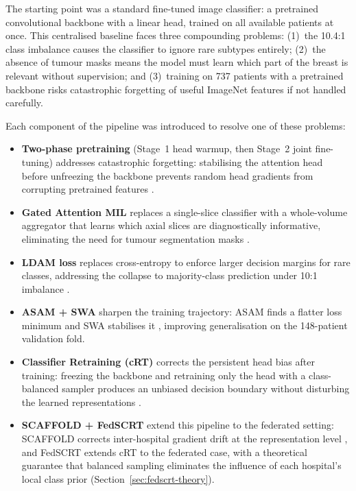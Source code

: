 The starting point was a standard fine-tuned image
classifier: a pretrained convolutional backbone with a
linear head, trained on all available patients at once.
This centralised baseline faces three compounding
problems: (1)~the 10.4:1 class imbalance causes the
classifier to ignore rare subtypes entirely;
(2)~the absence of tumour masks means the model must
learn which part of the breast is relevant without
supervision; and (3)~training on 737 patients with a
pretrained backbone risks catastrophic forgetting of
useful ImageNet features if not handled carefully.

Each component of the pipeline was introduced to
resolve one of these problems:

\begin{itemize}
  \item \textbf{Two-phase pretraining} (Stage~1 head
    warmup, then Stage~2 joint fine-tuning) addresses
    catastrophic forgetting: stabilising the attention
    head before unfreezing the backbone prevents
    random head gradients from corrupting pretrained
    features \cite{ilse2018attention}.

  \item \textbf{Gated Attention MIL} replaces a
    single-slice classifier with a whole-volume aggregator
    that learns which axial slices are diagnostically
    informative, eliminating the need for tumour
    segmentation masks \cite{ilse2018attention}.

  \item \textbf{LDAM loss} replaces cross-entropy to
    enforce larger decision margins for rare classes,
    addressing the collapse to majority-class prediction
    under 10:1 imbalance \cite{cao2019ldam}.

  \item \textbf{ASAM + SWA} sharpen the training
    trajectory: ASAM finds a flatter loss minimum
    \cite{kwon2021asam} and SWA stabilises it
    \cite{izmailov2018swa}, improving generalisation
    on the 148-patient validation fold.

  \item \textbf{Classifier Retraining (cRT)} corrects
    the persistent head bias after training: freezing
    the backbone and retraining only the head with a
    class-balanced sampler produces an unbiased
    decision boundary without disturbing the learned
    representations \cite{kang2020decoupling}.

  \item \textbf{SCAFFOLD + FedSCRT} extend this
    pipeline to the federated setting: SCAFFOLD
    corrects inter-hospital gradient drift at the
    representation level \cite{karimireddy2020scaffold}, and FedSCRT extends cRT
    to the federated case, with a theoretical
    guarantee that balanced sampling eliminates the
    influence of each hospital's local class prior
    (Section~\ref{sec:fedscrt-theory}).
\end{itemize}

